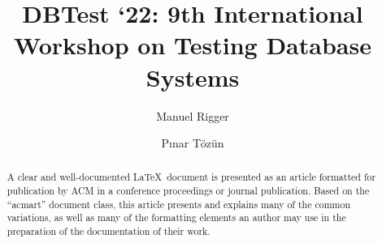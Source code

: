 \documentclass[sigconf]{acmart}
\begin{document}
\fancyhead{}






\title{DBTest ‘22: 9th International Workshop on Testing Database Systems}


\author{Manuel Rigger}

\author{Pınar Tözün}

\begin{abstract}
  A clear and well-documented \LaTeX\ document is presented as an
  article formatted for publication by ACM in a conference proceedings
  or journal publication. Based on the ``acmart'' document class, this
  article presents and explains many of the common variations, as well
  as many of the formatting elements an author may use in the
  preparation of the documentation of their work.
\end{abstract}
\end{document}
